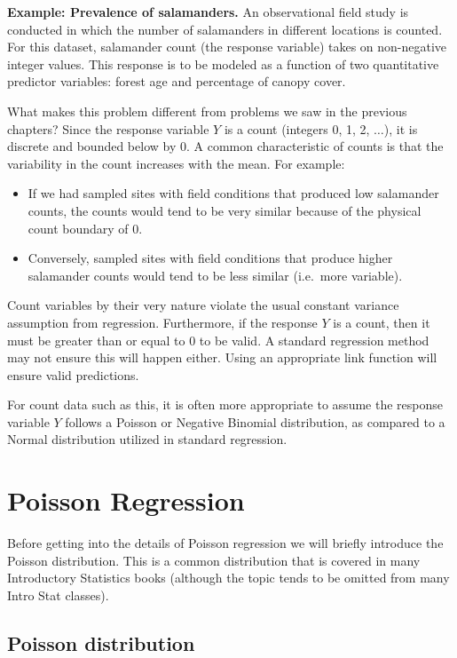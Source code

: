 \documentclass[
]{book}
\providecommand{\tightlist}{%
  \setlength{\itemsep}{0pt}\setlength{\parskip}{0pt}}
\begin{document}
\textbf{Example: Prevalence of salamanders.} An observational field study is conducted in which the number of salamanders in different locations is counted. For this dataset, salamander count (the response variable) takes on non-negative integer values. This response is to be modeled as a function of two quantitative predictor variables: forest age and percentage of canopy cover.

What makes this problem different from problems we saw in the previous chapters? Since the response variable \(Y\) is a count (integers 0, 1, 2, \(\ldots\)), it is discrete and bounded below by 0. A common characteristic of counts is that the variability in the count increases with the mean. For example:

\begin{itemize}
\tightlist
\item
  If we had sampled sites with field conditions that produced low salamander counts, the counts would tend to be very similar because of the physical count boundary of 0.
\item
  Conversely, sampled sites with field conditions that produce higher salamander counts would tend to be less similar (i.e.~more variable).
\end{itemize}

Count variables by their very nature violate the usual constant variance assumption from regression. Furthermore, if the response \(Y\) is a count, then it must be greater than or equal to 0 to be valid. A standard regression method may not ensure this will happen either. Using an appropriate link function will ensure valid predictions.

For count data such as this, it is often more appropriate to assume the response variable \(Y\) follows a Poisson or Negative Binomial distribution, as compared to a Normal distribution utilized in standard regression.

\hypertarget{poisson-regression}{%
\section{Poisson Regression}\label{poisson-regression}}

Before getting into the details of Poisson regression we will briefly introduce the Poisson distribution. This is a common distribution that is covered in many Introductory Statistics books (although the topic tends to be omitted from many Intro Stat classes).

\hypertarget{poisson-distribution}{%
\subsection{Poisson distribution}\label{poisson-distribution}}
\end{document}
